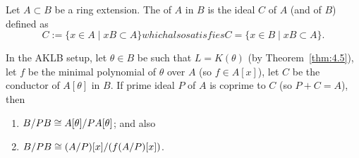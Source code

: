 \begin{definition}
Let $A\subset B$ be a ring extension. The  of $A$ in
$B$ is the ideal $C$ of $A$ (and of $B$) defined as
\begin{subequations}
\begin{equation}
C:=\{x\in A \mid xB\subset A\}
\end{equation}
which also satisfies
\begin{equation}
C=\{x\in B\mid xB\subset A\}.
\end{equation}
\end{subequations}
\end{definition}

\begin{lemma}\label{lemma:19.6}
In the AKLB setup, let $\theta\in B$ be such that $L=K(\theta)$ (by Theorem~\ref{thm:4.5}),
let $f$ be the minimal polynomial of $\theta$ over $A$ (so $f\in A[x]$),
let $C$ be the conductor of $A[\theta]$ in $B$. 
If prime ideal $P$ of $A$ is coprime to $C$ (so $P+C=A$),
then
\begin{enumerate}
\item $B/PB\cong A[\theta]/PA[\theta]$; and also
\item $B/PB\cong (A/P)[x]/(f(A/P)[x])$.
\end{enumerate}
\end{lemma}

